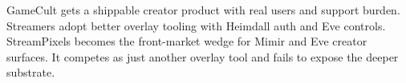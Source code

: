 \ProjectionBand
{GameCult gets a shippable creator product with real users and support burden.}
{Streamers adopt better overlay tooling with Heimdall auth and Eve controls.}
{StreamPixels becomes the front-market wedge for Mimir and Eve creator surfaces.}
{It competes as just another overlay tool and fails to expose the deeper substrate.}

